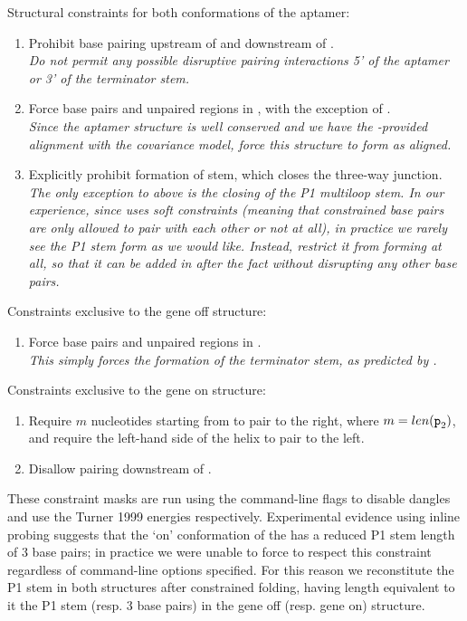 {\large Structural constraints for both conformations of the \grb aptamer:}
\begin{enumerate}
\item Prohibit base pairing upstream of  and
downstream of . \\ {\em Do not permit any possible disruptive pairing
interactions 5' of the aptamer or 3' of the terminator stem.}
\item Force base pairs and unpaired regions in , with
the exception of . \\ {\em Since the aptamer structure is well
conserved and we have the \infernal-provided alignment with the
covariance model, force this structure to form as aligned.}
\item Explicitly prohibit formation of  stem, which closes the
three-way junction. \\ {\em The only exception to above is the closing of the
P1 multiloop stem. In our experience, since \rfold uses soft constraints
(meaning that constrained base pairs are only allowed to pair with each other
or not at all), in practice we rarely see the P1 stem form as we would like.
Instead, restrict it from forming at all, so that it can be added in after the
fact without disrupting any other base pairs.}
\end{enumerate}
{\large Constraints exclusive to the gene off structure:}
\begin{enumerate}
\item Force base pairs and unpaired regions in . \\ {\em This simply
forces the formation of the terminator stem, as predicted by \tthp.}
\end{enumerate}
{\large Constraints exclusive to the gene on structure:}
\begin{enumerate}
\item Require $m$ nucleotides starting from  to pair to the
right, where $m = len({\text{\mbox{\tt p}}}_{\text{2}})$, and require the left-hand side of the
 helix to pair to the left.
\item Disallow pairing downstream of .
\end{enumerate}
\clearpage

These constraint masks are run using the command-line flags
 to disable dangles and use the Turner 1999
energies respectively. Experimental evidence using inline probing suggests that
the `on' conformation of the \grb has a reduced P1 stem length of 3 base pairs;
in practice we were unable to force \rfold to respect this constraint regardless
of command-line options specified. For this reason we reconstitute the P1 stem in
both structures after constrained folding, having length equivalent to it the
\infernal P1 stem (resp. 3 base pairs) in the gene off (resp. gene on) structure.

